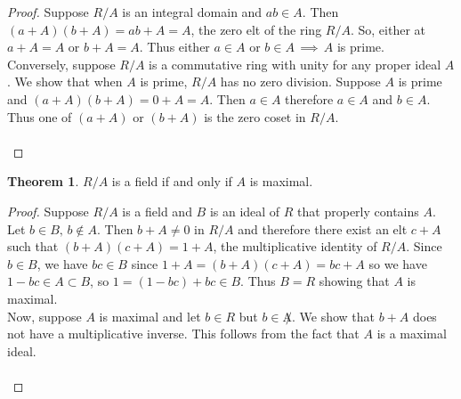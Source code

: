 \documentclass[11pt,a4paper]{article}
\theoremstyle{definition}
\newtheorem{thm}{Theorem}[subsection]
\begin{document}
\begin{proof}
Suppose $R/A$ is an integral domain and $ab\in A$. Then $(a + A)(b + A) = ab + A  = A$, the zero elt of the ring $R/A$. So, either at $a + A = A$ or $b + A = A$. Thus either $a\in A$ or $b\in A\, \implies\, A$ is prime.\\
Conversely, suppose $R/A$ is a commutative ring with unity for any proper ideal $A$. We show that when $A$ is prime, $R/A$ has no zero division. Suppose $A$ is prime and $(a +A)(b + A) = 0 + A = A$. Then $a\in A$ therefore $a\in A$ and $b\in A$. Thus one of $(a + A) $ or  $(b + A)$ is the zero coset in $R/A$.\\\\
\end{proof}






\begin{thm}
$R/A$ is a field if and only if $A$ is maximal.\\
\end{thm}

\begin{proof}
Suppose $R/A$ is a field and $B$ is an ideal of $R$ that properly contains $A$. Let $b\in B,\, b\not\in A$. Then $b+A \neq 0$ in $R/A$ and therefore there exist an elt $c + A$ such that $(b + A)(c + A) = 1 + A$, the multiplicative identity of $R/A$. Since $b\in B$, we have $bc\in B$ since $1 + A = (b + A)(c + A) = bc + A$ so we have $1 - bc \in A\subset B$, so $1 = (1 - bc) + bc \in B$. Thus $B = R$ showing that $A$ is maximal.\\
Now, suppose $A$ is maximal and let $b\in R$ but $b\in\not A$. We show that $b + A$ does not have a multiplicative inverse. This follows from the fact that $A$ is a maximal ideal.\\\\
\end{proof}
\end{document}
